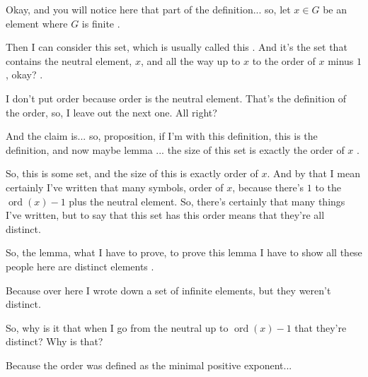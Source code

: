 \begin{speech}[01:25:43 - 01:27:08]
Okay, and you will notice here that part of the definition... so, let $x \in G$ be an element where $G$ is finite .

Then I can consider this set, which is usually called this . And it's the set that contains the neutral element, $x$, and all the way up to $x$ to the order of $x$ minus $1$, okay? .

I don't put order because order is the neutral element. That's the definition of the order, so, I leave out the next one. All right?

And the claim is... so, proposition, if I'm with this definition, this is the definition, and now maybe lemma ... the size of this set is exactly the order of $x$ .

So, this is some set, and the size of this is exactly order of $x$. And by that I mean certainly I've written that many symbols, order of $x$, because there's $1$ to the $\operatorname{ord}(x)-1$ plus the neutral element. So, there's certainly that many things I've written, but to say that this set has this order means that they're all distinct.

So, the lemma, what I have to prove, to prove this lemma I have to show all these people here are distinct elements .
\end{speech}

\begin{speech}[01:27:08 - 01:27:29]
Because over here I wrote down a set of infinite elements, but they weren't distinct.

So, why is it that when I go from the neutral up to $\operatorname{ord}(x)-1$ that they're distinct? Why is that?
\end{speech}

\begin{student}
Because the order was defined as the minimal positive exponent...
\end{student}

